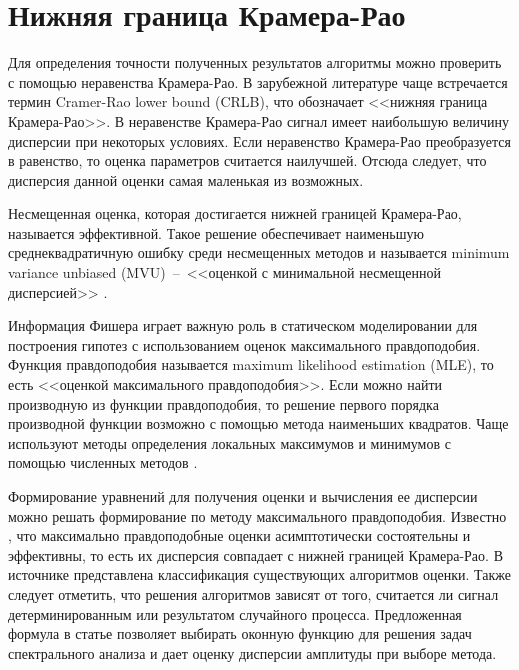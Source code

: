 \section{Нижняя граница Крамера-Рао} \label{sec:ch2/sec5} %
Для определения точности полученных результатов алгоритмы можно проверить с помощью неравенства Крамера-Рао. В зарубежной литературе чаще встречается термин Cramer-Rao lower bound (CRLB), что обозначает <<нижняя граница Крамера-Рао>>. В неравенстве Крамера-Рао сигнал имеет наибольшую величину дисперсии при некоторых условиях. Если неравенство Крамера-Рао преобразуется в равенство, то оценка параметров считается наилучшей. Отсюда следует, что дисперсия данной оценки самая маленькая из возможных. 

Несмещенная оценка, которая достигается нижней границей Крамера-Рао, называется эффективной. Такое решение обеспечивает наименьшую среднеквадратичную ошибку среди несмещенных методов и называется minimum variance unbiased (MVU)~--~<<оценкой с минимальной несмещенной дисперсией>> \cite{altman2020boundary}.

Информация Фишера играет важную роль в статическом моделировании для построения гипотез с использованием оценок максимального правдоподобия. Функция правдоподобия называется maximum likelihood estimation (MLE), то есть <<оценкой максимального правдоподобия>>. Если можно найти производную из функции правдоподобия, то решение первого порядка производной функции возможно с помощью метода наименьших квадратов. Чаще используют методы определения локальных максимумов и минимумов с помощью численных методов \cite{press1992art}.


Формирование уравнений для получения оценки и вычисления ее дисперсии можно решать формирование по методу максимального правдоподобия. Известно \cite{kay1993fundamentals}, что максимально правдоподобные оценки асимптотически состоятельны и эффективны, то есть их дисперсия совпадает с нижней границей Крамера-Рао. В источнике \cite{kay2013fundamentals} представлена классификация существующих алгоритмов оценки. Также следует отметить, что решения алгоритмов зависят от того, считается ли сигнал детерминированным или результатом случайного процесса. Предложенная формула в статье позволяет выбирать оконную функцию для решения задач спектрального анализа и дает оценку дисперсии амплитуды при выборе метода.

